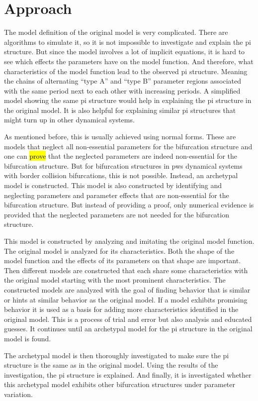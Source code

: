 \chapter{Approach}
\label{chap:approach}

The model definition of the original model is very complicated.
There are algorithms to simulate it, so it is not impossible to investigate and explain the \gls{pi} structure.
But since the model involves a lot of implicit equations, it is hard to see which effects the parameters have on the model function.
And therefore, what characteristics of the model function lead to the observed \gls{pi} structure.
Meaning the chains of alternating ``type A'' and ``type B'' parameter regions associated with the same period next to each other with increasing periods.
A simplified model showing the same \gls{pi} structure would help in explaining the \gls{pi} structure in the original model.
It is also helpful for explaining similar \gls{pi} structures that might turn up in other dynamical systems.

As mentioned before, this is usually achieved using normal forms.
These are models that neglect all non-essential parameters for the bifurcation structure and one can \hl{prove} that the neglected parameters are indeed non-essential for the bifurcation structure.
But for bifurcation structures in \gls{pws} dynamical systems with border collision bifurcations, this is not possible.
Instead, an archetypal model is constructed.
This model is also constructed by identifying and neglecting parameters and parameter effects that are non-essential for the bifurcation structure.
But instead of providing a proof, only numerical evidence is provided that the neglected parameters are not needed for the bifurcation structure.

This model is constructed by analyzing and imitating the original model function.
The original model is analyzed for its characteristics.
Both the shape of the model function and the effects of its parameters on that shape are important.
Then different models are constructed that each share some characteristics with the original model starting with the most prominent characteristics.
The constructed models are analyzed with the goal of finding behavior that is similar or hints at similar behavior as the original model.
If a model exhibits promising behavior it is used as a basis for adding more characteristics identified in the original model.
This is a process of trial and error but also analysis and educated guesses.
It continues until an archetypal model for the \gls{pi} structure in the original model is found.

The archetypal model is then thoroughly investigated to make sure the \gls{pi} structure is the same as in the original model.
Using the results of the investigation, the \gls{pi} structure is explained.
And finally, it is investigated whether this archetypal model exhibits other bifurcation structures under parameter variation.
